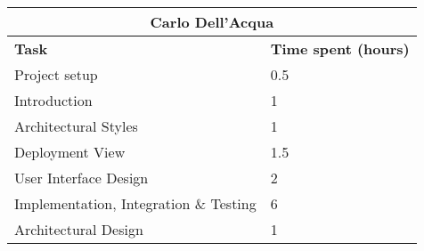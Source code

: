 \begin{table}[h]
  \centering
  \begin{tabular}{l|l}
    \multicolumn{2}{c}{\textbf{Carlo Dell'Acqua}} \\
    \hline
    \textbf{Task} & \textbf{Time spent (hours)}\\
    \hline
    Project setup & 0.5 \\
    Introduction & 1 \\
    Architectural Styles & 1 \\
    Deployment View & 1.5 \\
    User Interface Design & 2 \\
    Implementation, Integration \& Testing & 6 \\
    Architectural Design & 1 \\
  \end{tabular}
\end{table}